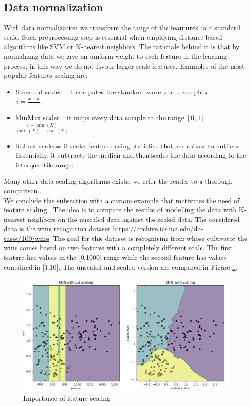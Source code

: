 \subsection{Data normalization}\label{appendix:normalization}
With data normalization we transform the range of the feautures to a standard scale.
Such preprocessing step is essential when employing distance based algorithms like SVM or K-nearest neighbors. The rationale behind it is that by normalizing data we give an uniform weight to each feature in the learning process; in this way we do not favour larger scale features.
Examples of the most popular features scaling are:
\begin{itemize}
    \item Standard scaler= it computes the standard score $z$ of a sample $x$
    \\
    $z=\frac{x-\mu}{\sigma}$.
    \item MinMax scaler= it maps every data sample to the range $[0,1]$.
    \\
    $\frac{x-\min(X)}{\max(X)-\min(X)}$
    \item Robust scaler= it scales features using statistics that are robust to outliers.
    Essentially, it subtracts the median and then scales the data according to the interquantile range.
\end{itemize}
Many other data scaling algorithms exists, we refer the reader to a thorough comparison .
\\
We conclude this subsection with a custom example that motivates the need of feature scaling . The idea is to compare the results of modelling the data with K-nearest neighbors on the unscaled data against the scaled data. The considered data is the wine recognition dataset \href{https://archive.ics.uci.edu/dataset/109/wine}{https://archive.ics.uci.edu/da-taset/109/wine}. The goal for this dataset is recognising from whose cultivator the wine comes based on two features with a completely different scale. The first feature has values in the [0,1000] range while the second feature has values contained in [1,10].
The unscaled and scaled version are compared in Figure \ref{fig:feature_scaler_example}.
\begin{figure}[!h]
    \includegraphics[width=\textwidth]{images/feature_scaler_example.png}
    \caption{Importance of feature scaling}
    \label{fig:feature_scaler_example}
\end{figure}
